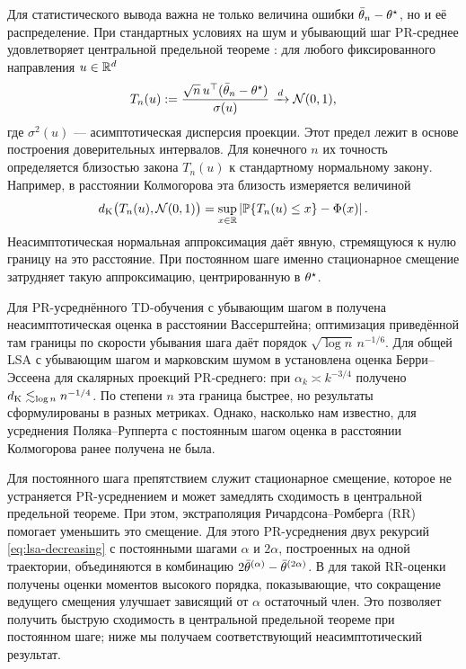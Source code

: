 \documentclass[blind]{psta}
\begin{document}
Для статистического вывода важна не только величина ошибки
$\bar{\theta}_n-\theta^\star$, но и её распределение. При стандартных условиях на шум
и убывающий шаг PR-среднее удовлетворяет центральной предельной теореме
\cite{PolyakJuditsky1992,Samsonov2025}: для любого фиксированного направления
$u\in\mathbb{R}^d$
\begin{equation}\label{eq:intro-clt}
 T_n(u):=\frac{\sqrt n\,u^\top(\bar{\theta}_n-\theta^\star)}{\sigma(u)}
 \xrightarrow{\,d\,}\mathcal{N}(0,1),
\end{equation}
где $\sigma^2(u)$ --- асимптотическая дисперсия проекции.
Этот предел лежит в основе построения доверительных интервалов. Для конечного
$n$ их точность определяется близостью закона $T_n(u)$ к стандартному
нормальному закону. Например, в расстоянии Колмогорова эта близость измеряется
величиной
\[
 d_{\mathrm K}\bigl(T_n(u),\mathcal{N}(0,1)\bigr)
 =\sup_{x\in\mathbb{R}}\left\vert \mathbb{P}\{T_n(u)\leq x\}-\Phi(x)\right\vert.
\]
Неасимптотическая нормальная аппроксимация даёт явную, стремящуюся к нулю
границу на это расстояние. При постоянном шаге именно стационарное смещение
затрудняет такую аппроксимацию, центрированную в $\theta^\star$.

Для PR-усреднённого TD-обучения с убывающим шагом в \cite{Srikant2024} получена
неасимптотическая оценка в расстоянии Вассерштейна; оптимизация приведённой
там границы по скорости убывания шага даёт порядок
$\sqrt{\log n}\,n^{-1/6}$. Для общей LSA с убывающим шагом и марковским шумом
в \cite{Samsonov2025} установлена оценка Берри--Эссеена для
скалярных проекций PR-среднего: при $\alpha_k\asymp k^{-3/4}$ получено
$d_{\mathrm K}\lesssim_{\log{n}}n^{-1/4}$. По степени
$n$ эта граница быстрее, но результаты сформулированы в разных метриках.
Однако, насколько нам известно, для усреднения Поляка--Рупперта с постоянным
шагом оценка в расстоянии Колмогорова ранее получена не была.


Для постоянного шага препятствием служит стационарное смещение, которое не
устраняется PR-усреднением \cite{Dieuleveut2020,Huo2024,Levin2026} и может
замедлять сходимость в центральной предельной теореме. При этом, экстраполяция Ричардсона--Ромберга (RR) помогает уменьшить это смещение. Для
этого PR-усреднения двух рекурсий \eqref{eq:lsa-decreasing} с постоянными шагами
$\alpha$ и $2\alpha$, построенных на одной траектории, объединяются в
комбинацию $2\bar{\theta}^{(\alpha)}-\bar{\theta}^{(2\alpha)}$. В
\cite{Levin2026} для такой RR-оценки получены оценки моментов высокого порядка,
показывающие, что сокращение ведущего смещения улучшает зависящий от
$\alpha$ остаточный член. Это позволяет получить быструю
сходимость в центральной предельной теореме при постоянном шаге; ниже мы
получаем соответствующий неасимптотический результат.
\end{document}

